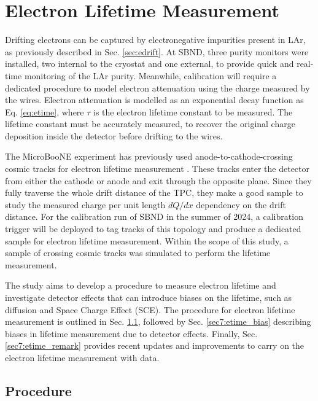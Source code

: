\newpage
\section{Electron Lifetime Measurement}
\label{sec7:etime}
Drifting electrons can be captured by electronegative impurities present in LAr, as previously described in Sec. \ref{sec:edrift}.
At SBND, three purity monitors were installed, two internal to the cryostat and one external, to provide quick and real-time monitoring of the LAr purity.
Meanwhile, calibration will require a dedicated procedure to model electron attenuation using the charge measured by the wires.
Electron attenuation is modelled as an exponential decay function as Eq. \ref{eq:etime}, where $\tau$ is the electron lifetime constant to be measured.
The lifetime constant must be accurately measured, to recover the original charge deposition inside the detector before drifting to the wires.

The MicroBooNE experiment has previously used anode-to-cathode-crossing cosmic tracks for electron lifetime measurement \cite{uboone_calib}.
These tracks enter the detector from either the cathode or anode and exit through the opposite plane.
Since they fully traverse the whole drift distance of the TPC, they make a good sample to study the measured charge per unit length $dQ/dx$ dependency on the drift distance.
For the calibration run of SBND in the summer of 2024, a calibration trigger will be deployed to tag tracks of this topology and produce a dedicated sample for electron lifetime measurement.
Within the scope of this study, a sample of crossing cosmic tracks was simulated to perform the lifetime measurement.

The study aims to develop a procedure to measure electron lifetime and investigate detector effects that can introduce biases on the lifetime, such as diffusion and Space Charge Effect (SCE).
The procedure for electron lifetime measurement is outlined in Sec. \ref{sec7:etime_procedure}, followed by Sec. \ref{sec7:etime_bias} describing biases in lifetime measurement due to detector effects.
Finally, Sec. \ref{sec7:etime_remark} provides recent updates and improvements to carry on the electron lifetime measurement with data.

\subsection{Procedure}
\label{sec7:etime_procedure}

